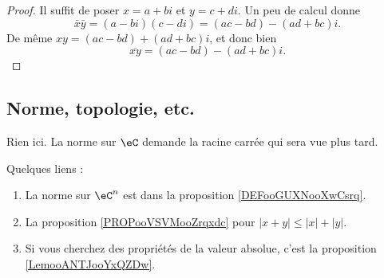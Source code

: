 \begin{proof}
	Il suffit de poser \( x=a+bi\) et \( y=c+di\). Un peu de calcul donne
	\begin{equation}
		\bar x\bar y=(a-bi)(c-di)=(ac-bd)-(ad+bc)i.
	\end{equation}
	De même \( xy=(ac-bd)+(ad+bc)i\), et donc bien
	\begin{equation}
		\overline{xy}=(ac-bd)-(ad+bc)i.
	\end{equation}
\end{proof}



\subsection{Norme, topologie, etc.}


Rien ici. La norme sur \( \eC\) demande la racine carrée qui sera vue plus tard.

Quelques liens :
\begin{enumerate}
	\item
	      La norme sur \( \eC^n\) est dans la proposition \ref{DEFooGUXNooXwCsrq}.
	\item
	      La proposition \ref{PROPooVSVMooZrqxdc} pour \( | x+y |\leq |x|+| y |\).
	\item
	      Si vous cherchez des propriétés de la valeur absolue, c'est la proposition \ref{LemooANTJooYxQZDw}.
\end{enumerate}
